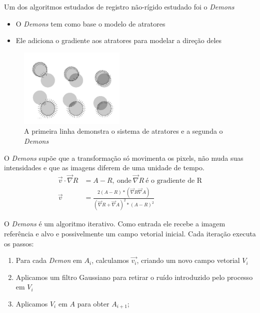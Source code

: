 \documentclass[t]{beamer}
\begin{document}
\begin{frame}
  Um dos algoritmos estudados de registro não-rígido estudado foi o \textit{Demons} \cite{thirion1995fast}
  \begin{itemize}
    \item O \textit{Demons} tem como base o modelo de atratores
    \item Ele adiciona o gradiente aos atratores para modelar a direção deles
  \end{itemize}
  \begin{figure}[H]
      \centering
      \includegraphics[width=0.45\textwidth]{figuras/demons.jpg}
      \caption{A primeira linha demonstra o sistema de atratores e a segunda o \textit{Demons}}
      \label{fig:demons}
  \end{figure}
\end{frame}

\begin{frame}
  O \textit{Demons} supõe que a transformação só movimenta os pixels, não muda suas intensidades e que as imagens 
  diferem de uma unidade de tempo. 
  \begin{align}
    \label{derivada}
    \vec{v} \cdot \vec{\nabla}R &= A - R, \ \text{onde} \ \vec{\nabla} R \ \text{é o gradiente de R} \\
    \vec{v} &= \frac{2(A - R)*(\vec{\nabla}R\vec{\nabla}A)}{(\vec{\nabla}R+\vec{\nabla}A)^2*(A - R)^2}
  \end{align}
\end{frame}

\begin{frame}
    O \textit{Demons} é um algoritmo iterativo. Como entrada ele recebe a imagem referência e alvo e possivelmente um campo
vetorial inicial. Cada iteração executa os passos:
\begin{enumerate}
    \item Para cada \textit{Demon} em $A_i$, calculamos $\vec{v_i}$, criando um novo campo vetorial $V_i$
    \item Aplicamos um filtro Gaussiano para retirar o ruído introduzido pelo processo em $V_i$
    \item Aplicamos $V_i$ em $A$ para obter $A_{i+1}$;
\end{enumerate}
\end{frame}
\end{document}

